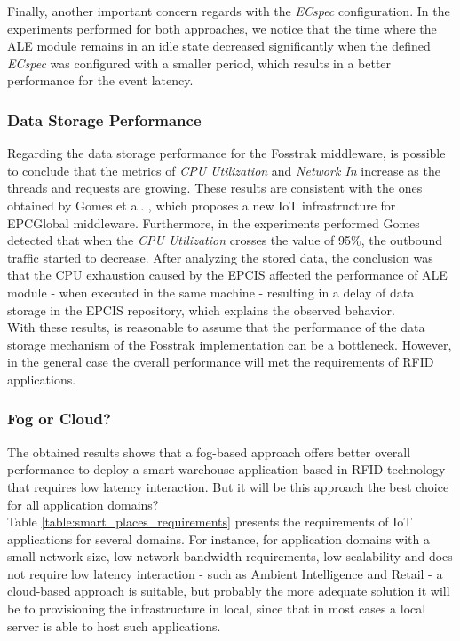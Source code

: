Finally, another important concern regards with the \textit{ECspec} configuration. In the experiments
performed for both approaches, we notice that the time where the \gls{ALE} module remains in an idle
state decreased significantly when the defined \textit{ECspec} was configured with a smaller period,
which results in a better performance for the event latency.

\subsubsection{Data Storage Performance}
\label{subs:eval_results_data}
Regarding the data storage performance for the Fosstrak middleware, is possible to conclude that the metrics
of \textit{CPU Utilization} and \textit{Network In} increase as the threads and requests are growing.
These results are consistent with the ones obtained by Gomes et al. \cite{gomes2014future}, which
proposes a new \gls{IoT} infrastructure for \gls{EPC}Global middleware. Furthermore, in the experiments
performed Gomes detected that when the \textit{CPU Utilization} crosses the value of 95$\%$, the
outbound traffic started to decrease. After analyzing the stored data, the conclusion was that the
\gls{CPU} exhaustion caused by the \gls{EPCIS} affected the performance of \gls{ALE} module - when
executed in the same machine - resulting in a delay of data storage in the \gls{EPCIS} repository,
which explains the observed behavior.\\

With these results, is reasonable to assume that the performance of the data storage mechanism of
the Fosstrak implementation can be a bottleneck. However, in the general case the overall
performance will met the requirements of \gls{RFID} applications.

\subsubsection{Fog or Cloud?}
\label{subs:eval_conclusion}
The obtained results shows that a fog-based approach offers better overall performance to deploy a
smart warehouse application based in \gls{RFID} technology that requires low latency interaction.
But it will be this approach the best choice for all application domains?\\

Table \ref{table:smart_places_requirements} presents the requirements of \gls{IoT} applications
for several domains. For instance, for application domains with a small network size, low network
bandwidth requirements, low scalability and does not require low latency interaction - such as Ambient
Intelligence and Retail - a cloud-based approach is suitable, but probably the more adequate
solution it will be to provisioning the infrastructure in local, since that in most cases a local
server is able to host such applications.\\

